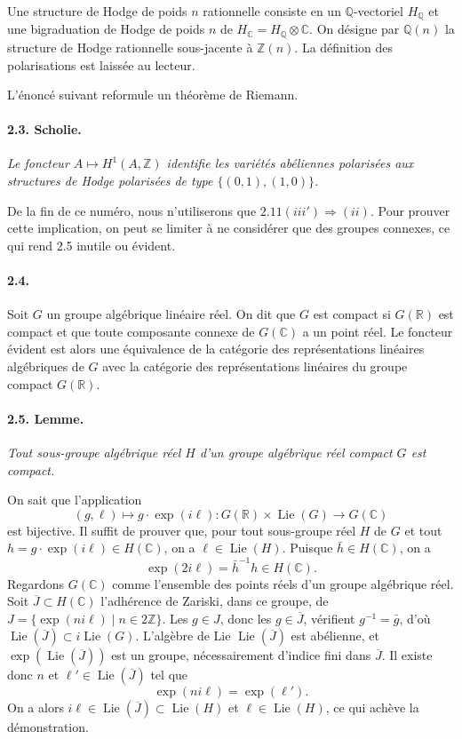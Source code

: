 \documentclass[10pt]{article}
\newcommand{\C}{\mathbb{C}}
\newcommand{\Q}{\mathbb{Q}}
\newcommand{\R}{\mathbb{R}}
\newcommand{\Z}{\mathbb{Z}}
\newcommand{\Lie}{\operatorname{Lie}}
\begin{document}
Une structure de Hodge de poids $n$ rationnelle consiste en un $\Q$-vectoriel $H_\Q$ et une bigraduation de Hodge de poids $n$ de $H_\C=H_\Q\otimes\C$. On désigne par $\Q(n)$ la structure de Hodge rationnelle sous-jacente à $\Z(n)$. La définition des polarisations est laissée au lecteur.

L'énoncé suivant reformule un théorème de Riemann.

\paragraph{2.3. Scholie.} \emph{Le foncteur $A\mapsto H^1(A,\Z)$ identifie les variétés abéliennes polarisées aux structures de Hodge polarisées de type $\{(0,1),(1,0)\}$.}

De la fin de ce numéro, nous n'utiliserons que $2.11(iii')\Rightarrow(ii)$. Pour prouver cette implication, on peut se limiter à ne considérer que des groupes connexes, ce qui rend 2.5 inutile ou évident.

\paragraph{2.4.} Soit $G$ un groupe algébrique linéaire réel. On dit que $G$ est compact si $G(\R)$ est compact et que toute composante connexe de $G(\C)$ a un point réel. Le foncteur évident est alors une équivalence de la catégorie des représentations linéaires algébriques de $G$ avec la catégorie des représentations linéaires du groupe compact $G(\R)$.

\paragraph{2.5. Lemme.} \emph{Tout sous-groupe algébrique réel $H$ d'un groupe algébrique réel compact $G$ est compact.}

On sait que l'application
\[
(g,\ell)\longmapsto g\cdot\exp(i\ell):G(\R)\times\Lie(G)\longrightarrow G(\C)
\]
est bijective. Il suffit de prouver que, pour tout sous-groupe réel $H$ de $G$ et tout $h=g\cdot\exp(i\ell)\in H(\C)$, on a $\ell\in\Lie(H)$. Puisque $\bar h\in H(\C)$, on a
\[
\exp(2i\ell)=\bar h^{-1}h\in H(\C).
\]
Regardons $G(\C)$ comme l'ensemble des points réels d'un groupe algébrique réel. Soit $\overline J\subset H(\C)$ l'adhérence de Zariski, dans ce groupe, de $J=\{\exp(ni\ell)\mid n\in2\Z\}$. Les $g\in J$, donc les $g\in\overline J$, vérifient $g^{-1}=\bar g$, d'où $\Lie(\overline J)\subset i\Lie(G)$. L'algèbre de Lie $\Lie(\overline J)$ est abélienne, et $\exp(\Lie(\overline J))$ est un groupe, nécessairement d'indice fini dans $\overline J$. Il existe donc $n$ et $\ell'\in\Lie(\overline J)$ tel que
\[
\exp(ni\ell)=\exp(\ell').
\]
On a alors $i\ell\in\Lie(\overline J)\subset\Lie(H)$ et $\ell\in\Lie(H)$, ce qui achève la démonstration.
\end{document}
